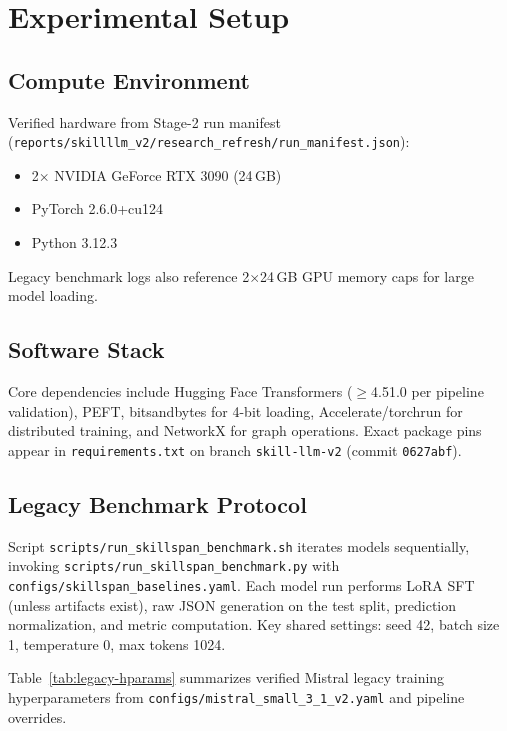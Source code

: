 \chapter{Experimental Setup}
\label{ch:experiments}

\section{Compute Environment}

Verified hardware from Stage-2 run manifest (\texttt{reports/skillllm\_v2/research\_refresh/run\_manifest.json}):

\begin{itemize}
  \item 2$\times$ NVIDIA GeForce RTX 3090 (24\,GB)
  \item PyTorch 2.6.0+cu124
  \item Python 3.12.3
\end{itemize}

Legacy benchmark logs also reference 2$\times$24\,GB GPU memory caps for large model loading.

\section{Software Stack}

Core dependencies include Hugging Face Transformers ($\geq$4.51.0 per pipeline validation), PEFT, bitsandbytes for 4-bit loading, Accelerate/torchrun for distributed training, and NetworkX for graph operations.
Exact package pins appear in \texttt{requirements.txt} on branch \texttt{skill-llm-v2} (commit \texttt{0627abf}).

\section{Legacy Benchmark Protocol}

Script \texttt{scripts/run\_skillspan\_benchmark.sh} iterates models sequentially, invoking \texttt{scripts/run\_skillspan\_benchmark.py} with \texttt{configs/skillspan\_baselines.yaml}.
Each model run performs LoRA SFT (unless artifacts exist), raw JSON generation on the test split, prediction normalization, and metric computation.
Key shared settings: seed 42, batch size 1, temperature 0, max tokens 1024.

Table~\ref{tab:legacy-hparams} summarizes verified Mistral legacy training hyperparameters from \texttt{configs/mistral\_small\_3\_1\_v2.yaml} and pipeline overrides.

